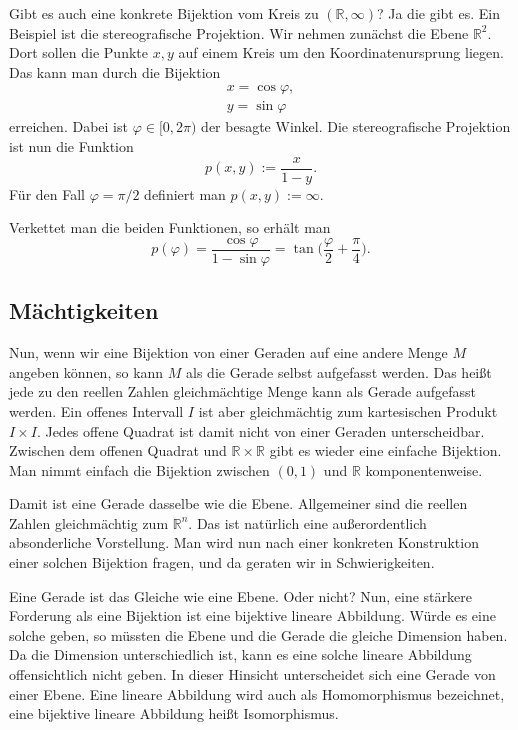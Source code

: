 \documentclass[a4paper,10pt,fleqn,twocolumn,twoside,dvipdfmx]{scrartcl}
\newcommand{\R}{\mathbb R}
\begin{document}
Gibt es auch eine konkrete Bijektion vom Kreis zu
$(\R,\infty)$? Ja die gibt es. Ein Beispiel ist die
stereografische Projektion. Wir nehmen zunächst die Ebene
$\R^2$. Dort sollen die Punkte $x,y$ auf einem Kreis
um den Koordinatenursprung liegen. Das kann man durch die Bijektion
\begin{gather}
x=\cos\varphi,\\
y=\sin\varphi
\end{gather}
erreichen. Dabei ist $\varphi\in{[0,2\pi)}$ der besagte Winkel.
Die stereografische Projektion ist nun die Funktion
\begin{equation}
p(x,y) := \frac{x}{1-y}.
\end{equation}
Für den Fall $\varphi=\pi/2$ definiert man $p(x,y):=\infty$.

Verkettet man die beiden Funktionen, so erhält man
\begin{equation}
p(\varphi) = \frac{\cos\varphi}{1-\sin\varphi}
= \tan\Big(\frac{\varphi}{2}+\frac{\pi}{4}\Big).
\end{equation}

\subsection{Mächtigkeiten}

Nun, wenn wir eine Bijektion von einer Geraden auf eine andere Menge
$M$ angeben können, so kann $M$ als die Gerade selbst aufgefasst
werden. Das heißt jede zu den reellen Zahlen gleichmächtige Menge
kann als Gerade aufgefasst werden. Ein offenes Intervall $I$ ist
aber gleichmächtig zum kartesischen Produkt $I\times I$. Jedes
offene Quadrat ist damit nicht von einer Geraden unterscheidbar.
Zwischen dem offenen Quadrat und $\R\times\R$ gibt
es wieder eine einfache Bijektion. Man nimmt einfach die Bijektion
zwischen $(0,1)$ und $\R$ komponentenweise.

Damit ist eine Gerade dasselbe wie die Ebene. Allgemeiner sind die
reellen Zahlen gleichmächtig zum $\R^n$. Das ist natürlich
eine außerordentlich absonderliche Vorstellung. Man wird nun nach
einer konkreten Konstruktion einer solchen Bijektion fragen, und
da geraten wir in Schwierigkeiten.

Eine Gerade ist das Gleiche wie eine Ebene. Oder nicht?
Nun, eine stärkere Forderung als eine Bijektion ist eine
bijektive lineare Abbildung. Würde es eine solche geben, so müssten
die Ebene und die Gerade die gleiche Dimension haben. Da die Dimension
unterschiedlich ist, kann es eine solche lineare Abbildung
offensichtlich nicht geben. In dieser Hinsicht unterscheidet sich
eine Gerade von einer Ebene. Eine lineare Abbildung wird auch als
Homomorphismus bezeichnet, eine bijektive lineare Abbildung heißt
Isomorphismus.
\end{document}
